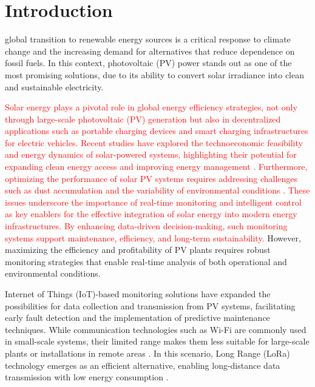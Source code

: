 \section{Introduction}
\label{sec:introduction}
  global transition to renewable energy sources is a critical response to climate change and the increasing demand for alternatives that reduce dependence on fossil fuels. In this context, photovoltaic (PV) power stands out as one of the most promising solutions, due to its ability to convert solar irradiance into clean and sustainable electricity. 

\textcolor{red}{ Solar energy plays a pivotal role in global energy efficiency strategies, not only through large-scale photovoltaic (PV) generation but also in decentralized applications such as portable charging devices and smart charging infrastructures for electric vehicles. Recent studies have explored the technoeconomic feasibility and energy dynamics of solar-powered systems, highlighting their potential for expanding clean energy access and improving energy management \cite{spmfpcd2023,smartcharging2023}. Furthermore, optimizing the performance of solar PV systems requires addressing challenges such as dust accumulation and the variability of environmental conditions \cite{dustsurvey2023,optimizationreview2023}. These issues underscore the importance of real-time monitoring and intelligent control as key enablers for the effective integration of solar energy into modern energy infrastructures. By enhancing data-driven decision-making, such monitoring systems support maintenance, efficiency, and long-term sustainability.
}
However, maximizing the efficiency and profitability of PV plants requires robust monitoring strategies that enable real-time analysis of both operational and environmental conditions. 

Internet of Things (IoT)-based monitoring solutions have expanded the possibilities for data collection and transmission from PV systems, facilitating early fault detection and the implementation of predictive maintenance techniques. While communication technologies such as Wi-Fi are commonly used in small-scale systems, their limited range makes them less suitable for large-scale plants or installations in remote areas \cite{kalay2022systematic}. In this scenario, Long Range (LoRa) technology emerges as an efficient alternative, enabling long-distance data transmission with low energy consumption \cite{ansari2021review}.



